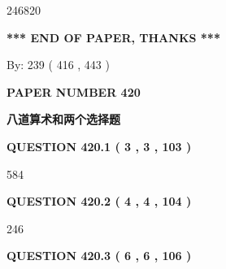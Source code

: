 \documentclass{ctexart}
\begin{document}
  
 
 
\noindent{}

246820
 
 
   
   
 \vspace{0.2in}
 
   
   
   
   
\vspace{1.0in} 
{\textbf{\large{ *** END OF PAPER, THANKS *** }}} 
   
   
\hspace{1.0in} By: 
 239 ( 416 ,  443 )
   
   
   
   
\newpage 
\setcounter{page}{ 
   420001 } 
   
   
   
   
 {\textbf{ \Large{ PAPER NUMBER  420  }}}
   
   
\vspace{0.2in}
   
   
   
   
   
   
 \vspace{0.2in}
{\LARGE {\textbf{ 八道算术和两个选择题}}}
   
   
  
\vspace{0.2in}
  
{\textbf{\Large{QUESTION
420.1 
 ( 3 , 3 , 103 )
}}}
  
  
 
 
\noindent{}

584
 
 
  
\vspace{0.2in}
  
{\textbf{\Large{QUESTION
420.2 
 ( 4 , 4 , 104 )
}}}
  
  
 
 
\noindent{}

246
 
 
  
\vspace{0.2in}
  
{\textbf{\Large{QUESTION
420.3 
 ( 6 , 6 , 106 )
}}}
  
\end{document}
